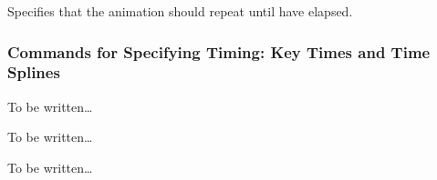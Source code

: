 \begin{command}{\pgfsys@animation@repeat@dur{}}
  Specifies that the animation should repeat until  have
  elapsed. 
\begin{codeexample}[width=3.5cm]
\end{codeexample}
\end{command}



\subsubsection{Commands for Specifying Timing: Key Times and Time Splines}

\begin{command}{\pgfsys@animation@keytime{}}
  To be written\dots
\end{command}

\begin{command}{\pgfsys@animation@keyprogress{}}
  To be written\dots
\end{command}

\begin{command}{\pgfsys@animation@keysplinecontrol{}}
  To be written\dots
\end{command}



